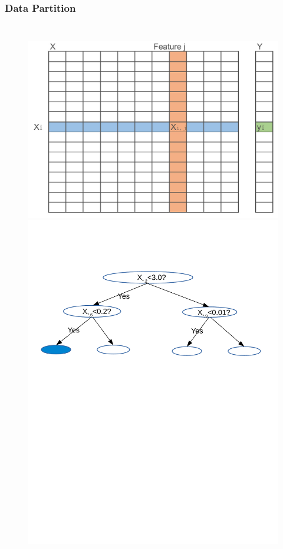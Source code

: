 \documentclass{beamer}
\begin{document}
\begin{frame}
	\frametitle{Data Partition}
	\begin{columns}[c] %
		
		\begin{figure}
			\includegraphics[width=1\linewidth]{figs/dataset.jpg} \\
			\includegraphics[width=1\linewidth]{figs/dtree}
		\end{figure}
		

\end{columns}
\end{frame}
\end{document}
